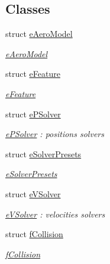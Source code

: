 \subsection*{Classes}
\begin{CompactItemize}
\item 
struct \hyperlink{structbt_soft_body_1_1e_aero_model}{eAeroModel}
\begin{CompactList}\small\item\em \hyperlink{structbt_soft_body_1_1e_aero_model}{eAeroModel} \item\end{CompactList}\item 
struct \hyperlink{structbt_soft_body_1_1e_feature}{eFeature}
\begin{CompactList}\small\item\em \hyperlink{structbt_soft_body_1_1e_feature}{eFeature} \item\end{CompactList}\item 
struct \hyperlink{structbt_soft_body_1_1e_p_solver}{ePSolver}
\begin{CompactList}\small\item\em \hyperlink{structbt_soft_body_1_1e_p_solver}{ePSolver} : positions solvers \item\end{CompactList}\item 
struct \hyperlink{structbt_soft_body_1_1e_solver_presets}{eSolverPresets}
\begin{CompactList}\small\item\em \hyperlink{structbt_soft_body_1_1e_solver_presets}{eSolverPresets} \item\end{CompactList}\item 
struct \hyperlink{structbt_soft_body_1_1e_v_solver}{eVSolver}
\begin{CompactList}\small\item\em \hyperlink{structbt_soft_body_1_1e_v_solver}{eVSolver} : velocities solvers \item\end{CompactList}\item 
struct \hyperlink{structbt_soft_body_1_1f_collision}{fCollision}
\begin{CompactList}\small\item\em \hyperlink{structbt_soft_body_1_1f_collision}{fCollision} \item\end{CompactList}\item 

\end{CompactItemize}
